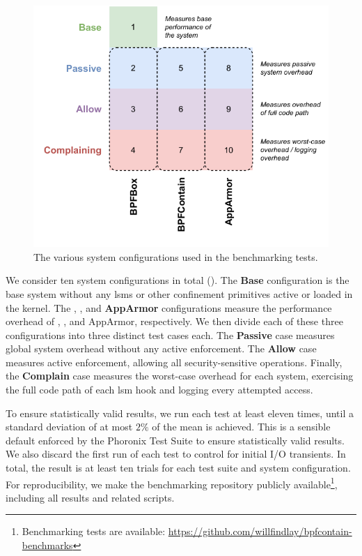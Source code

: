 \begin{figure}[htp]
  \centering
  \includegraphics[width=0.8\linewidth]{figs/eval/configuration.pdf}
  \caption[Benchmarking system configurations]{
    The various system configurations used in the benchmarking tests.
  }%
  \label{fig:configuration}
\end{figure}

We consider ten system configurations in total (). The
\textbf{Base} configuration is the base system without any \glspl{lsm} or other
confinement primitives active or loaded in the kernel. The \textbf{\bpfbox},
\textbf{\bpfcontain}, and \textbf{AppArmor} configurations measure the performance
overhead of \bpfbox{}, \bpfcontain{}, and AppArmor, respectively. We then divide each of
these three configurations into three distinct test cases each. The \textbf{Passive} case
measures global system overhead without any active enforcement. The \textbf{Allow} case
measures active enforcement, allowing all security-sensitive operations. Finally, the
\textbf{Complain} case measures the worst-case overhead for each system, exercising the
full code path of each \gls{lsm} hook and logging every attempted access.

To ensure statistically valid results, we run each test at least eleven times, until
a standard deviation of at most $2\%$ of the mean is achieved. This is a sensible default
enforced by the Phoronix Test Suite to ensure statistically valid results. We also discard
the first run of each test to control for initial I/O transients. In total, the result is
at least ten trials for each test suite and system configuration. For reproducibility, we
make the benchmarking repository publicly available\footnote{Benchmarking tests are
available: \url{https://github.com/willfindlay/bpfcontain-benchmarks}}, including all
results and related scripts.


